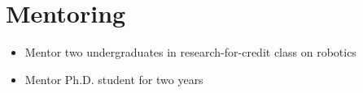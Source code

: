 \section{Mentoring}

\vspace{6pt}
 
\begin{itemize}

\item[]{Mentor two undergraduates in research-for-credit class on robotics}

\vspace{6pt}

\item[]{Mentor Ph.D. student for two years}

\end{itemize}